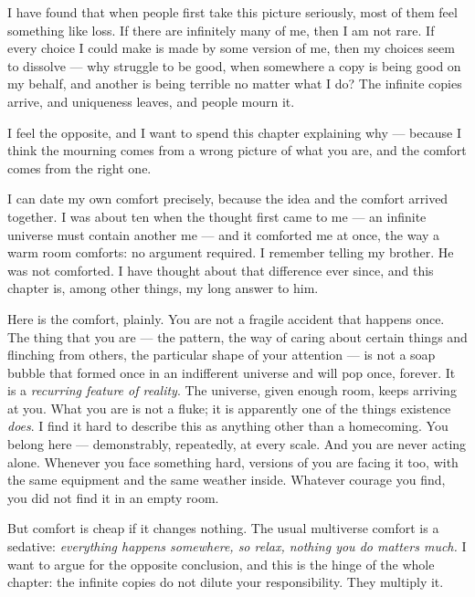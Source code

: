\documentclass[fontsize=11pt,paper=a4,pagesize=auto,parskip=half-]{scrbook}
\begin{document}
I have found that when people first take this picture seriously, most of them feel something like loss. If there are infinitely many of me, then I am not rare. If every choice I could make is made by some version of me, then my choices seem to dissolve --- why struggle to be good, when somewhere a copy is being good on my behalf, and another is being terrible no matter what I do? The infinite copies arrive, and uniqueness leaves, and people mourn it.

I feel the opposite, and I want to spend this chapter explaining why --- because I think the mourning comes from a wrong picture of what you are, and the comfort comes from the right one.

I can date my own comfort precisely, because the idea and the comfort arrived together. I was about ten when the thought first came to me --- an infinite universe must contain another me --- and it comforted me at once, the way a warm room comforts: no argument required. I remember telling my brother. He was not comforted. I have thought about that difference ever since, and this chapter is, among other things, my long answer to him.

Here is the comfort, plainly. You are not a fragile accident that happens once. The thing that you are --- the pattern, the way of caring about certain things and flinching from others, the particular shape of your attention --- is not a soap bubble that formed once in an indifferent universe and will pop once, forever. It is a \emph{recurring feature of reality}. The universe, given enough room, keeps arriving at you. What you are is not a fluke; it is apparently one of the things existence \emph{does}. I find it hard to describe this as anything other than a homecoming. You belong here --- demonstrably, repeatedly, at every scale. And you are never acting alone. Whenever you face something hard, versions of you are facing it too, with the same equipment and the same weather inside. Whatever courage you find, you did not find it in an empty room.

But comfort is cheap if it changes nothing. The usual multiverse comfort is a sedative: \emph{everything happens somewhere, so relax, nothing you do matters much.} I want to argue for the opposite conclusion, and this is the hinge of the whole chapter: the infinite copies do not dilute your responsibility. They multiply it.
\end{document}
